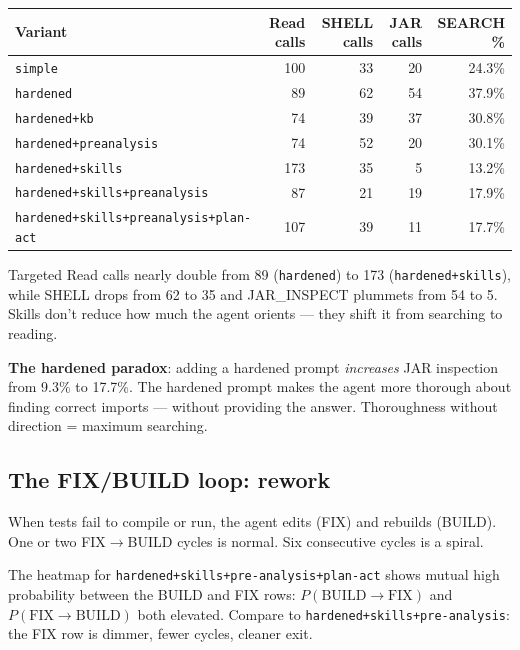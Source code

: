 \documentclass[11pt,a4paper]{article}
\begin{document}
\begin{center}
\begin{tabular}{@{}lrrrr@{}}
\toprule
\textbf{Variant} & \textbf{Read calls} & \textbf{SHELL calls} & \textbf{JAR calls} & \textbf{SEARCH \%} \\
\midrule
\texttt{simple}              & 100 & 33 & 20 & 24.3\% \\
\texttt{hardened}            &  89 & 62 & 54 & 37.9\% \\
\texttt{hardened+kb}         &  74 & 39 & 37 & 30.8\% \\
\texttt{hardened+preanalysis}          &  74 & 52 & 20 & 30.1\% \\
\texttt{hardened+skills}     & 173 & 35 &  5 & 13.2\% \\
\texttt{hardened+skills+preanalysis} &  87 & 21 & 19 & 17.9\% \\
\texttt{hardened+skills+preanalysis+plan-act} & 107 & 39 & 11 & 17.7\% \\
\bottomrule
\end{tabular}
\end{center}

Targeted Read calls nearly double from 89 (\texttt{hardened}) to 173 (\texttt{hardened+skills}),
while SHELL drops from 62 to 35 and JAR\_INSPECT plummets from 54 to 5.
Skills don't reduce how much the agent orients --- they shift it from searching to reading.

\begin{notebox}
\textbf{The hardened paradox}: adding a hardened prompt \emph{increases} JAR inspection
from 9.3\% to 17.7\%. The hardened prompt makes the agent more thorough about finding
correct imports --- without providing the answer. Thoroughness without direction =
maximum searching.
\end{notebox}

\subsection*{The FIX/BUILD loop: rework}

When tests fail to compile or run, the agent edits (FIX) and rebuilds (BUILD).
One or two FIX$\to$BUILD cycles is normal. Six consecutive cycles is a spiral.

The heatmap for \texttt{hardened+skills+pre-analysis+plan-act} shows mutual high probability
between the BUILD and FIX rows: $P(\text{BUILD}\to\text{FIX})$ and
$P(\text{FIX}\to\text{BUILD})$ both elevated. Compare to \texttt{hardened+skills+pre-analysis}:
the FIX row is dimmer, fewer cycles, cleaner exit.
\end{document}
